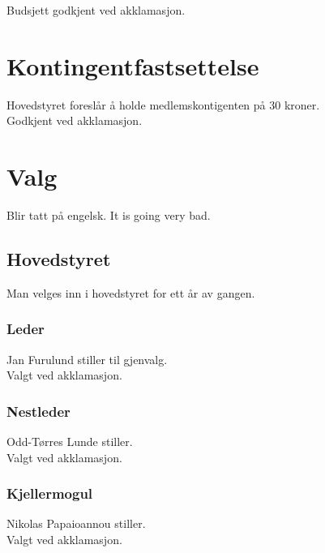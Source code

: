 \documentclass[10pt,norsk,a4paper]{article}
\begin{document}
Budsjett godkjent ved akklamasjon.


\section{Kontingentfastsettelse}
Hovedstyret foreslår å holde medlemskontigenten på 30 kroner.\\

Godkjent ved akklamasjon.

\section{Valg}
Blir tatt på engelsk. It is going very bad.\\
\begin{minipage}[t]{9cm}
\subsection{Hovedstyret}
Man velges inn i hovedstyret for ett år av gangen.
\subsubsection{Leder}
Jan Furulund stiller til gjenvalg.\\
Valgt ved akklamasjon.
\subsubsection{Nestleder}
Odd-Tørres Lunde stiller.\\
Valgt ved akklamasjon.
\subsubsection{Kjellermogul}
Nikolas Papaioannou stiller.\\
Valgt ved akklamasjon.
\end{minipage}
\end{document}

